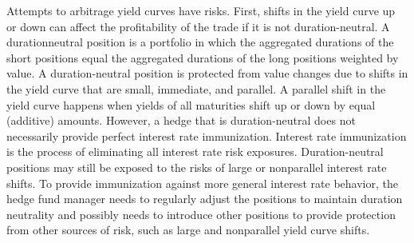 \documentclass[11pt]{article}
\begin{document}
Attempts to arbitrage yield curves have risks. First, shifts in the yield curve up or down can affect the profitability of the trade if it is not duration-neutral. A durationneutral position is a portfolio in which the aggregated durations of the short positions equal the aggregated durations of the long positions weighted by value. A duration-neutral position is protected from value changes due to shifts in the yield curve that are small, immediate, and parallel. A parallel shift in the yield curve happens when yields of all maturities shift up or down by equal (additive) amounts. However, a hedge that is duration-neutral does not necessarily provide perfect interest rate immunization. Interest rate immunization is the process of eliminating all interest rate risk exposures. Duration-neutral positions may still be exposed to the risks of large or nonparallel interest rate shifts. To provide immunization against more general interest rate behavior, the hedge fund manager needs to regularly adjust the positions to maintain duration neutrality and possibly needs to introduce other positions to provide protection from other sources of risk, such as large and nonparallel yield curve shifts.
\end{document}
